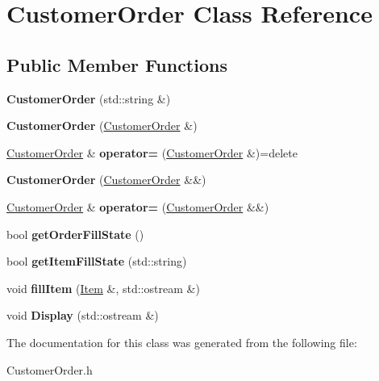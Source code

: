 \hypertarget{class_customer_order}{}\section{Customer\+Order Class Reference}
\label{class_customer_order}
\subsection*{Public Member Functions}
\begin{DoxyCompactItemize}
\item 
\mbox{\label{class_customer_order_a00e1cb818605bcd7457febba4ca9e166}} 
{\bfseries Customer\+Order} (std\+::string \&)
\item 
\mbox{\label{class_customer_order_a88603e0493f6bf116b6301be6f36b152}} 
{\bfseries Customer\+Order} (\mbox{\hyperlink{class_customer_order}{Customer\+Order}} \&)
\item 
\mbox{\label{class_customer_order_a1a83b197a0ca27da950b7321273c46a5}} 
\mbox{\hyperlink{class_customer_order}{Customer\+Order}} \& {\bfseries operator=} (\mbox{\hyperlink{class_customer_order}{Customer\+Order}} \&)=delete
\item 
\mbox{\label{class_customer_order_ac46e4af986aecae685a6d745d98b0381}} 
{\bfseries Customer\+Order} (\mbox{\hyperlink{class_customer_order}{Customer\+Order}} \&\&)
\item 
\mbox{\label{class_customer_order_a0567505c22f226c50eeb925e611b411b}} 
\mbox{\hyperlink{class_customer_order}{Customer\+Order}} \& {\bfseries operator=} (\mbox{\hyperlink{class_customer_order}{Customer\+Order}} \&\&)
\item 
\mbox{\label{class_customer_order_a36aede6a3339abdd2f476119dea55cf4}} 
bool {\bfseries get\+Order\+Fill\+State} ()
\item 
\mbox{\label{class_customer_order_a108f3b4e8ebe8075642b24a5d06ed869}} 
bool {\bfseries get\+Item\+Fill\+State} (std\+::string)
\item 
\mbox{\label{class_customer_order_a935ba17e7f591b90bde0c3dc5b5eb8e5}} 
void {\bfseries fill\+Item} (\mbox{\hyperlink{class_item}{Item}} \&, std\+::ostream \&)
\item 
\mbox{\label{class_customer_order_a7ae264df8502dca90853887064922abe}} 
void {\bfseries Display} (std\+::ostream \&)
\end{DoxyCompactItemize}


The documentation for this class was generated from the following file\+:\begin{DoxyCompactItemize}
\item 
Customer\+Order.\+h\end{DoxyCompactItemize}
